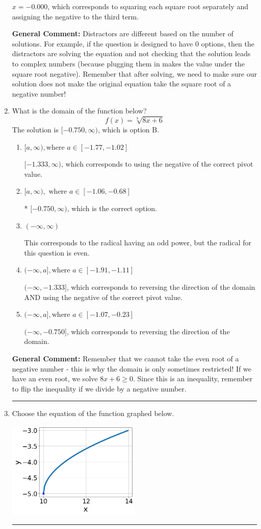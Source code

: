 \documentclass{extbook}[14pt]
\newcommand{\litem}[1]{\item #1

\rule{\textwidth}{0.4pt}}
\begin{document}
\begin{enumerate}
{\begin{enumerate}[label=\Alph*.]
$x = -0.000$, which corresponds to squaring each square root separately and assigning the negative to the third term.
\end{enumerate}

\textbf{General Comment:} Distractors are different based on the number of solutions. For example, if the question is designed to have 0 options, then the distractors are solving the equation and not checking that the solution leads to complex numbers (because plugging them in makes the value under the square root negative). Remember that after solving, we need to make sure our solution does not make the original equation take the square root of a negative number!
}
\litem{
What is the domain of the function below?
\[ f(x) = \sqrt[8]{8 x + 6} \]The solution is \( [-0.750, \infty) \), which is option B.\begin{enumerate}[label=\Alph*.]
\item \( [a, \infty), \text{where } a \in [-1.77, -1.02] \)

$[-1.333, \infty)$, which corresponds to using the negative of the correct pivot value.
\item \( [a, \infty), \text{ where } a \in [-1.06, -0.68] \)

* $[-0.750, \infty)$, which is the correct option.
\item \( (-\infty, \infty) \)

This corresponds to the radical having an odd power, but the radical for this question is even.
\item \( (-\infty, a], \text{where } a \in [-1.91, -1.11] \)

$(-\infty, -1.333]$, which corresponds to reversing the direction of the domain AND using the negative of the correct pivot value.
\item \( (-\infty, a], \text{where } a \in [-1.07, -0.23] \)

 $(-\infty, -0.750]$, which corresponds to reversing the direction of the domain.
\end{enumerate}

\textbf{General Comment:} Remember that we cannot take the even root of a negative number - this is why the domain is only sometimes restricted! If we have an even root, we solve $8 x + 6 \geq 0$. Since this is an inequality, remember to flip the inequality if we divide by a negative number.
}
\litem{
Choose the equation of the function graphed below.

\begin{center}
    \includegraphics[width=0.5\textwidth]{../Figures/radicalGraphToEquationCopyC.png}
\end{center}


}
\end{enumerate}
\end{document}
